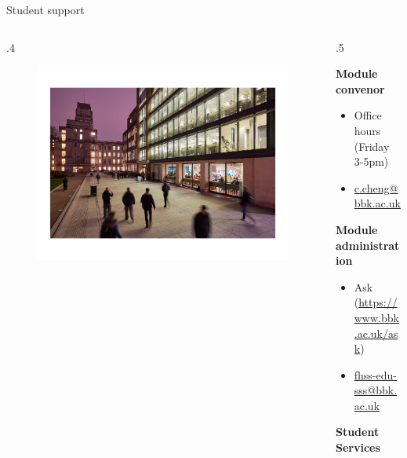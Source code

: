\documentclass[
  10pt,
  ignorenonframetext,
]{beamer}
\def\begincols{\begin{columns}}
\def\begincol{\begin{column}}
\def\endcol{\end{column}}
\def\endcols{\end{columns}}
\begin{document}
\begin{frame}{Student support}
\protect\hypertarget{student-support}{}
\begincols
  \begincol{.4\textwidth}
    \vspace{0.4cm}
    \begin{figure}
    \centering
    \includegraphics[scale=0.43]{Figs/head}
    \end{figure}
  \endcol
  \begincol{.5\textwidth}
  \hspace{0.2cm}
  \small

\noindent \textbf{Module convenor} \vspace{0.1cm}

\begin{itemize}
    \item Office hours (Friday 3-5pm)
    \item \url{c.cheng@bbk.ac.uk}
  \end{itemize}
  \vspace{0.5cm}

\noindent \textbf{Module administration} \vspace{0.1cm}

\begin{itemize}
    \item Ask (\url{https://www.bbk.ac.uk/ask})
    \item \url{fhss-edu-sss@bbk.ac.uk}
  \end{itemize}
  \vspace{0.5cm}

\noindent \textbf{Student Services} \endcol \endcols
\end{frame}
\end{document}
